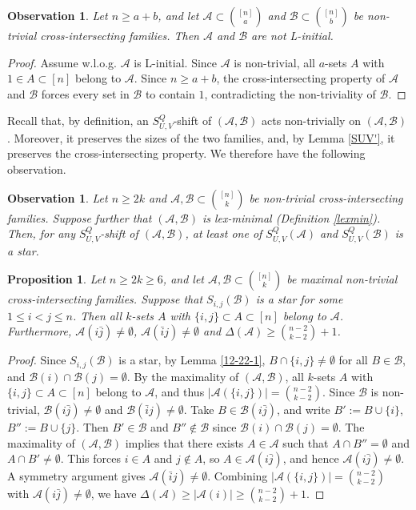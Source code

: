 \documentclass[a4paper,11pt]{article}
\newtheorem{proposition}[theorem]{Proposition}
\newtheorem{obser}[theorem]{Observation}
\newcommand{\m}{\mathcal}
\begin{document}
\begin{obser}\label{notlinitial}
Let $n\ge a+b$, and let $\m A\subset {[n]\choose a}$ and $\m B\subset {[n]\choose b}$ be non-trivial cross-intersecting families. Then $\m A$ and $\m B$ are not L-initial.
\end{obser}
\begin{proof}
Assume w.l.o.g. $\m A$ is L-initial.
Since $\m A$ is non-trivial, all $a$-sets $A$ with $1\in A\subset [n]$ belong to $\m A$.
Since $n\ge a+b$, the cross-intersecting property of $\m A$ and $\m B$ forces  every set in $\m B$ to contain $1$, contradicting the non-triviality of $\m B$.
\end{proof}

Recall that, by definition, an $S_{U,V}^Q$-shift of
$(\m A,\m B)$ acts non-trivially on $(\m A,\m B)$.
Moreover, it preserves the sizes of the two families, and, 
by Lemma \ref{SUV'}, it preserves the
cross-intersecting property. 
We therefore have the following observation.
\begin{obser}\label{12-25-2}
Let $n\ge 2k$ and $\mathcal{A}, \mathcal{B} \subset{[n]\choose k}$ be non-trivial cross-intersecting families. Suppose further that $(\m A, \m B)$ is lex-minimal (Definition \ref{lexmin}). Then, for any $S_{U,V}^Q$-shift of $(\m A, \m B)$, at least one of $S_{U,V}^Q(\mathcal{A})$ and $S_{U,V}^Q(\mathcal{B})$ is a star. 
\end{obser}
\begin{proposition}\label{1-1-2}
Let $n\ge 2k\ge 6$, and let $\mathcal{A}, \mathcal{B}\subset {[n]\choose k}$ be maximal non-trivial cross-intersecting families. Suppose that $S_{i,j}(\mathcal{B})$ is a star for some $1\le i<j \le n$. Then
all $k$-sets $A$ with $\{i,j\}\subset A \subset [n]$ belong to $\mathcal{A}$. Furthermore, $\mathcal{A}(i\bar{j})\ne \emptyset$, $\mathcal{A}(\bar{i}j)\ne \emptyset$ and $\Delta(\m A)\ge {n-2\choose k-2}+1$. 
\end{proposition}

\begin{proof}
Since $S_{i,j}(\mathcal{B})$ is a star, by Lemma \ref{12-22-1}, $B\cap \{i, j\}\ne \emptyset$ for all $B\in \mathcal{B}$, and $\mathcal{B}(i)\cap \mathcal{B}(j)=\emptyset$. 
By the  maximality of $(\mathcal{A}, \mathcal{B})$, all $k$-sets $A$ with $\{i,j\}\subset A \subset [n]$ belong to $\mathcal{A}$, and thus $|\m A(\{i,j\})|={n-2\choose k-2}$.
Since $\mathcal{B}$ is non-trivial, $\mathcal{B}(i\bar{j})\ne \emptyset$ and $\mathcal{B}(\bar{i}j)\ne \emptyset$. Take $B\in \mathcal{B}(i\bar{j})$, and write $B':=B\cup \{i\}$, $B'':=B\cup \{j\}$. Then $B'\in \m B$ and $B''\not\in \m B$ since 
$\mathcal{B}(i)\cap \mathcal{B}(j)=\emptyset$. 
The maximality of $(\mathcal{A}, \mathcal{B})$ implies that there exists $A\in \m A$ such that $A\cap B''=\emptyset$ and $A\cap B'\ne \emptyset$. 
This forces $i\in A$ and $j\not\in A$, so $A\in \mathcal{A}(i\bar{j})$, and hence $\mathcal{A}(i\bar{j})\ne \emptyset$. 
A symmetry argument gives $\mathcal{A}(\bar{i}j)\ne \emptyset$. 
Combining $|\m A(\{i,j\})|={n-2\choose k-2}$ with $\mathcal{A}(i\bar{j})\ne \emptyset$, we have $\Delta(\m A)\ge |\m A(i)|\ge {n-2\choose k-2}+1$. 
\end{proof}
\end{document}

